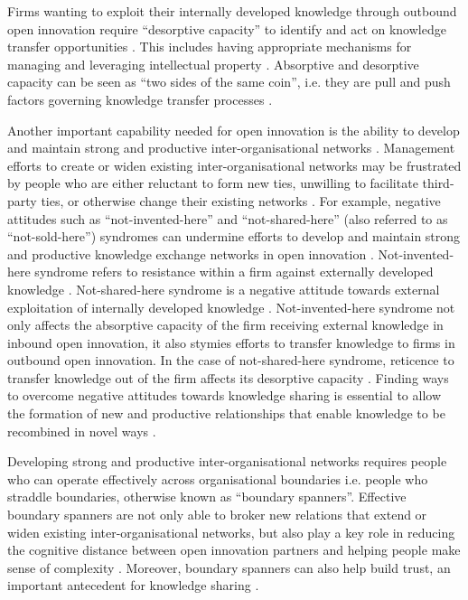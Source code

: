 Firms wanting to exploit their internally developed knowledge through outbound open innovation require \enquote{desorptive capacity} to identify and act on knowledge transfer opportunities \citep{lichtenthaler2010technology}. This includes having appropriate mechanisms for managing and leveraging intellectual property \citep{chesbrough2012open}. Absorptive and desorptive capacity can be seen as \enquote{two sides of the same coin}, i.e. they are pull and push factors governing knowledge transfer processes \citep{dell2015absorptive}. \medskip

Another important capability needed for open innovation is the ability to develop and maintain strong and productive inter\hyp{}organisational networks \citep{chesbrough2012open}. Management efforts to create or widen existing inter\hyp{}organisational networks may be frustrated by people who are either reluctant to form new ties, unwilling to facilitate third\hyp{}party ties, or otherwise change their existing networks \citep{davis2010agency}. For example, negative attitudes such as \enquote{not\hyp{}invented\hyp{}here} and \enquote{not\hyp{}shared\hyp{}here} (also referred to as \enquote{not\hyp{}sold\hyp{}here}) syndromes can undermine efforts to develop and maintain strong and productive knowledge exchange networks in open innovation \citep{lichtenthaler2006attitudes,de2014neither,podmetina2015skills}. Not\hyp{}invented\hyp{}here syndrome refers to resistance within a firm against externally developed knowledge \citep{katz1982investigating,hussinger2011search,antons2015opening}. Not\hyp{}shared\hyp{}here syndrome is a negative attitude towards external exploitation of internally developed knowledge \citep{chesbrough2003open,lichtenthaler2006attitudes,de2014neither}. Not\hyp{}invented\hyp{}here syndrome not only affects the absorptive capacity of the firm receiving external knowledge in inbound open innovation, it also stymies efforts to transfer knowledge to firms in outbound open innovation. In the case of not\hyp{}shared\hyp{}here syndrome, reticence to transfer knowledge out of the firm affects its desorptive capacity \citep{lichtenthaler2006attitudes}. Finding ways to overcome negative attitudes towards knowledge sharing is essential to allow the formation of new and productive relationships that enable knowledge to be recombined in novel ways \citep{nahapiet1998social,obstfeld2005social,davis2010agency,meyer2010rise,hussinger2011search}. \medskip

Developing strong and productive inter\hyp{}organisational networks requires people who can operate effectively across organisational boundaries i.e. people who straddle boundaries, otherwise known as \enquote{boundary spanners}. Effective boundary spanners are not only able to broker new relations that extend or widen existing inter\hyp{}organisational networks, but also play a key role in reducing the cognitive distance between open innovation partners and helping people make sense of complexity \citep{tushman1981boundary,fleming2007brokerage,goffin2010managing}. Moreover, boundary spanners can also help build trust, an important antecedent for knowledge sharing \citep{levin2004strength,renzl2008trust,meyer2010rise,sankowska2013relationships,kucharska2016trust}. \medskip

